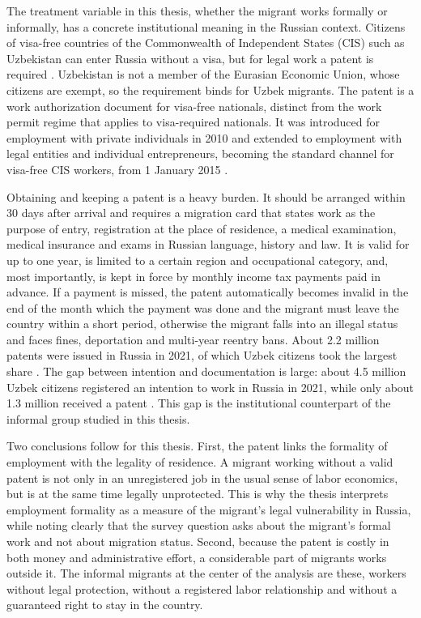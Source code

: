 The treatment variable in this thesis, whether the migrant works formally or informally, has a concrete institutional meaning in the Russian context. Citizens of visa-free countries of the Commonwealth of Independent States (CIS) such as Uzbekistan can enter Russia without a visa, but for legal work a patent is required \parencite[Art. 13.3]{law115fz}. Uzbekistan is not a member of the Eurasian Economic Union, whose citizens are exempt, so the requirement binds for Uzbek migrants. The patent is a work authorization document for visa-free nationals, distinct from the work permit regime that applies to visa-required nationals. It was introduced for employment with private individuals in 2010 \parencite{law86fz2010} and extended to employment with legal entities and individual entrepreneurs, becoming the standard channel for visa-free CIS workers, from 1 January 2015 \parencite{law357fz2014}.

Obtaining and keeping a patent is a heavy burden. It should be arranged within 30 days after arrival and requires a migration card that states work as the purpose of entry, registration at the place of residence, a medical examination, medical insurance and exams in Russian language, history and law. It is valid for up to one year, is limited to a certain region and occupational category, and, most importantly, is kept in force by monthly income tax payments paid in advance. If a payment is missed, the patent automatically becomes invalid in the end of the month which the payment was done and the migrant must leave the country within a short period, otherwise the migrant falls into an illegal status and faces fines, deportation and multi-year reentry bans. About 2.2 million patents were issued in Russia in 2021, of which Uzbek citizens took the largest share \parencite{tass2022patents}. The gap between intention and documentation is large: about 4.5 million Uzbek citizens registered an intention to work in Russia in 2021, while only about 1.3 million received a patent \parencite{schenk2023}. This gap is the institutional counterpart of the informal group studied in this thesis.

Two conclusions follow for this thesis. First, the patent links the formality of employment with the legality of residence. A migrant working without a valid patent is not only in an unregistered job in the usual sense of labor economics, but is at the same time legally unprotected. This is why the thesis interprets employment formality as a measure of the migrant's legal vulnerability in Russia, while noting clearly that the survey question asks about the migrant's formal work and not about migration status. Second, because the patent is costly in both money and administrative effort, a considerable part of migrants works outside it. The informal migrants at the center of the analysis are these, workers without legal protection, without a registered labor relationship and without a guaranteed right to stay in the country.


